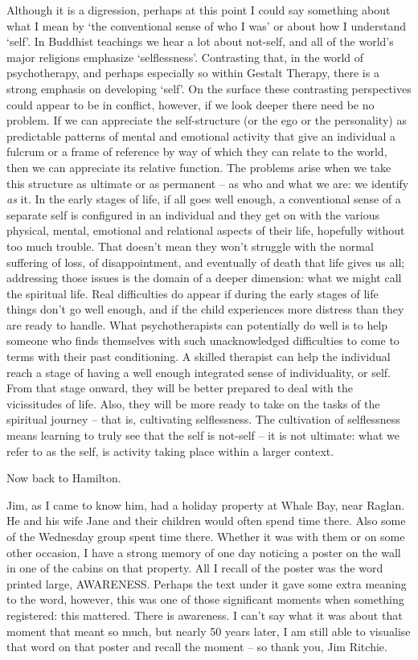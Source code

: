 Although it is a digression, perhaps at this point I could say something
about what I mean by `the conventional sense of who I was' or about how
I understand `self'. In Buddhist teachings we hear a lot about not-self,
and all of the world's major religions emphasize `selflessness'.
Contrasting that, in the world of psychotherapy, and perhaps especially
so within Gestalt Therapy, there is a strong emphasis on developing
`self'. On the surface these contrasting perspectives could appear to be
in conflict, however, if we look deeper there need be no problem. If we
can appreciate the self-structure (or the ego or the personality) as
predictable patterns of mental and emotional activity that give an
individual a fulcrum or a frame of reference by way of which they can
relate to the world, then we can appreciate its relative function. The
problems arise when we take this structure as ultimate or as permanent
-- as who and what we are: we identify \emph{as} it. In the early stages
of life, if all goes well enough, a conventional sense of a separate
self is configured in an individual and they get on with the various
physical, mental, emotional and relational aspects of their life,
hopefully without too much trouble. That doesn't mean they won't
struggle with the normal suffering of loss, of disappointment, and
eventually of death that life gives us all; addressing those issues is
the domain of a deeper dimension: what we might call the spiritual life.
Real difficulties do appear if during the early stages of life things
don't go well enough, and if the child experiences more distress than
they are ready to handle. What psychotherapists can potentially do well
is to help someone who finds themselves with such unacknowledged
difficulties to come to terms with their past conditioning. A skilled
therapist can help the individual reach a stage of having a well enough
integrated sense of individuality, or self. From that stage onward, they
will be better prepared to deal with the vicissitudes of life. Also,
they will be more ready to take on the tasks of the spiritual journey --
that is, cultivating selflessness. The cultivation of selflessness means
learning to truly see that the self is not-self -- it is not ultimate:
what we refer to as the self, is activity taking place within a larger
context.

Now back to Hamilton.

Jim, as I came to know him, had a holiday property at Whale Bay, near
Raglan. He and his wife Jane and their children would often spend time
there. Also some of the Wednesday group spent time there. Whether it was
with them or on some other occasion, I have a strong memory of one day
noticing a poster on the wall in one of the cabins on that property. All
I recall of the poster was the word printed large, AWARENESS. Perhaps
the text under it gave some extra meaning to the word, however, this was
one of those significant moments when something registered: this
mattered. There is awareness. I can't say what it was about that moment
that meant so much, but nearly 50 years later, I am still able to
visualise that word on that poster and recall the moment -- so thank
you, Jim Ritchie.

